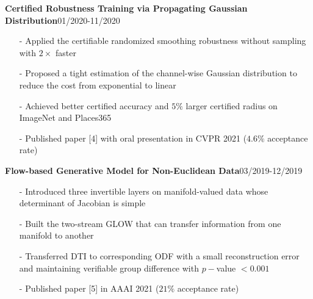 \documentclass[margin]{res}
\begin{document}
\begin{resume}
                 \vspace{-1em} 
                \textbf{Certified Robustness Training via Propagating Gaussian Distribution}\hfill 01/2020-11/2020
                \begin{itemize}\itemsep -2.2pt %
                 \item[-] Applied the certifiable randomized smoothing robustness without sampling with $2\times$ faster
                 \item[-] Proposed a tight estimation of the channel-wise Gaussian distribution to reduce the cost from exponential to linear
                 \item[-] Achieved better certified accuracy and $5\%$ larger certified radius on ImageNet and Places365
                 \item[-] Published paper [4] with oral presentation in CVPR 2021 ($4.6\%$ acceptance rate)
                 \end{itemize}

                 \vspace{-1em}  

                \textbf{Flow-based Generative Model for Non-Euclidean Data}\hfill 03/2019-12/2019
                \begin{itemize}\itemsep -2.2pt %
                 \item[-] Introduced three invertible layers on manifold-valued data whose determinant of Jacobian is simple
                 \item[-] Built the two-stream GLOW that can transfer information from one manifold to another
                 \item[-] Transferred DTI to corresponding ODF with a small reconstruction error and maintaining verifiable group difference with $p-$value $<0.001$
				\item[-] Published paper [5] in AAAI 2021 ($21\%$ acceptance rate)
                 \end{itemize}

                 \vspace{-1em}  


\end{resume}
\end{document}
